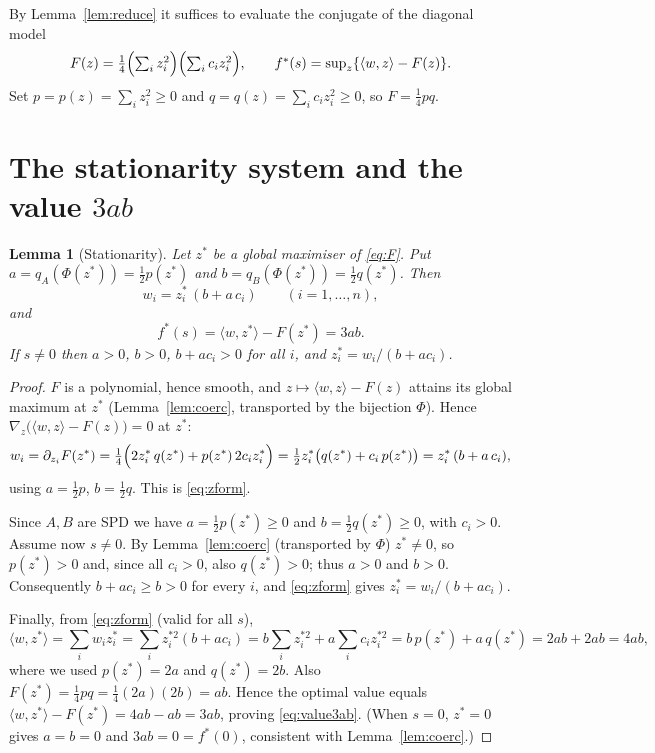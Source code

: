 \documentclass{amsart}
\newtheorem{lemma}{Lemma}
\theoremstyle{definition}
\begin{document}
By Lemma~\ref{lem:reduce} it suffices to evaluate the conjugate of the diagonal model
\begin{equation}\label{eq:F}
F(z)=\tfrac14\Bigl(\textstyle\sum_i z_i^2\Bigr)\Bigl(\textstyle\sum_i c_iz_i^2\Bigr),
\qquad
f^\ast(s)=\sup_{z}\{\langle w,z\rangle-F(z)\}.
\end{equation}
Set $p=p(z)=\sum_iz_i^2\ge0$ and $q=q(z)=\sum_i c_iz_i^2\ge0$, so $F=\tfrac14 pq$.

\section{The stationarity system and the value $3ab$}

\begin{lemma}[Stationarity]\label{lem:stat}
Let $z^\ast$ be a global maximiser of \eqref{eq:F}.  Put
$a=q_{A}(\Phi(z^\ast))=\tfrac12 p(z^\ast)$ and $b=q_{B}(\Phi(z^\ast))=\tfrac12 q(z^\ast)$.
Then
\begin{equation}\label{eq:zform}
w_i=z_i^\ast\,(b+a\,c_i)\qquad(i=1,\dots,n),
\end{equation}
and
\begin{equation}\label{eq:value3ab}
f^\ast(s)=\langle w,z^\ast\rangle-F(z^\ast)=3ab .
\end{equation}
If $s\neq0$ then $a>0$, $b>0$, $b+ac_i>0$ for all $i$, and $z_i^\ast=w_i/(b+ac_i)$.
\end{lemma}

\begin{proof}
$F$ is a polynomial, hence smooth, and $z\mapsto\langle w,z\rangle-F(z)$ attains its global maximum
at $z^\ast$ (Lemma~\ref{lem:coerc}, transported by the bijection $\Phi$).  Hence
$\nabla_z\bigl(\langle w,z\rangle-F(z)\bigr)=0$ at $z^\ast$:
\[
w_i=\partial_{z_i}F(z^\ast)
   =\tfrac14\Bigl(2z_i^\ast\,q(z^\ast)+p(z^\ast)\,2c_iz_i^\ast\Bigr)
   =\tfrac12 z_i^\ast\bigl(q(z^\ast)+c_i\,p(z^\ast)\bigr)
   = z_i^\ast\,(b+a\,c_i),
\]
using $a=\tfrac12 p$, $b=\tfrac12 q$.  This is \eqref{eq:zform}.

Since $A,B$ are SPD we have $a=\tfrac12 p(z^\ast)\ge0$ and $b=\tfrac12 q(z^\ast)\ge0$, with
$c_i>0$.  Assume now $s\ne0$.  By Lemma~\ref{lem:coerc} (transported by $\Phi$) $z^\ast\ne0$, so
$p(z^\ast)>0$ and, since all $c_i>0$, also $q(z^\ast)>0$; thus $a>0$ and $b>0$.  Consequently
$b+ac_i\ge b>0$ for every $i$, and \eqref{eq:zform} gives $z_i^\ast=w_i/(b+ac_i)$.

Finally, from \eqref{eq:zform} (valid for all $s$),
\[
\langle w,z^\ast\rangle=\sum_i w_iz_i^\ast=\sum_i z_i^{\ast2}(b+ac_i)
=b\sum_i z_i^{\ast2}+a\sum_ic_iz_i^{\ast2}
=b\,p(z^\ast)+a\,q(z^\ast)=2ab+2ab=4ab,
\]
where we used $p(z^\ast)=2a$ and $q(z^\ast)=2b$.  Also $F(z^\ast)=\tfrac14 p q=\tfrac14(2a)(2b)=ab$.
Hence the optimal value equals $\langle w,z^\ast\rangle-F(z^\ast)=4ab-ab=3ab$, proving
\eqref{eq:value3ab}.  (When $s=0$, $z^\ast=0$ gives $a=b=0$ and $3ab=0=f^\ast(0)$, consistent with
Lemma~\ref{lem:coerc}.)
\end{proof}
\end{document}
